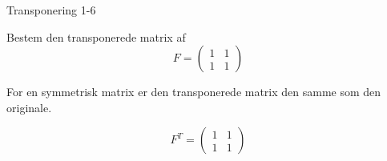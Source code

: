 \documentclass{article}
\begin{document}
\newpage

\begin{exercise}{Transponering 1-6}

Bestem den transponerede matrix af
\[
F = \begin{pmatrix} 1 & 1 \\ 1 & 1 \end{pmatrix}
\]


\hint

For en symmetrisk matrix er den transponerede matrix den samme som den originale.

\hint
\[
F^T = \begin{pmatrix} 1 & 1 \\ 1 & 1 \end{pmatrix}
\]

\end{exercise}
\end{document}
